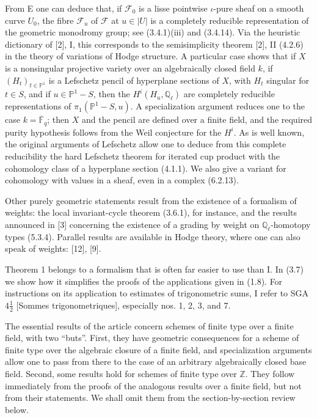 \documentclass[11pt]{article}
\theoremstyle{remark}
\newcommand{\Ql}{\mathbb{Q}_\ell}
\newcommand{\Fbar}{\overline{\mathbb{F}}_q}
\begin{document}
From E one can deduce that, if $\mathcal F_0$ is a lisse pointwise $\iota$-pure sheaf on a smooth curve $U_0$, the fibre $\mathcal F_u$ of $\mathcal F$ at $u\in |U|$ is a completely reducible representation of the geometric monodromy group; see (3.4.1)(iii) and (3.4.14). Via the heuristic dictionary of [2], I, this corresponds to the semisimplicity theorem [2], II (4.2.6) in the theory of variations of Hodge structure. A particular case shows that if $X$ is a nonsingular projective variety over an algebraically closed field $k$, if $(H_t)_{t\in\mathbb P^1}$ is a Lefschetz pencil of hyperplane sections of $X$, with $H_t$ singular for $t\in S$, and if $u\in\mathbb P^1-S$, then the $H^i(H_u,\Ql)$ are completely reducible representations of $\pi_1(\mathbb P^1-S,u)$. A specialization argument reduces one to the case $k=\Fbar$; then $X$ and the pencil are defined over a finite field, and the required purity hypothesis follows from the Weil conjecture for the $H^i$. As is well known, the original arguments of Lefschetz allow one to deduce from this complete reducibility the hard Lefschetz theorem for iterated cup product with the cohomology class of a hyperplane section (4.1.1). We also give a variant for cohomology with values in a sheaf, even in a complex (6.2.13).

Other purely geometric statements result from the existence of a formalism of weights: the local invariant-cycle theorem (3.6.1), for instance, and the results announced in [3] concerning the existence of a grading by weight on $\Ql$-homotopy types (5.3.4). Parallel results are available in Hodge theory, where one can also speak of weights: [12], [9].

Theorem 1 belongs to a formalism that is often far easier to use than I. In (3.7) we show how it simplifies the proofs of the applications given in (1.8). For instructions on its application to estimates of trigonometric sums, I refer to SGA $4\frac12$ [Sommes trigonometriques], especially nos. 1, 2, 3, and 7.

The essential results of the article concern schemes of finite type over a finite field, with two ``buts''. First, they have geometric consequences for a scheme of finite type over the algebraic closure of a finite field, and specialization arguments allow one to pass from there to the case of an arbitrary algebraically closed base field. Second, some results hold for schemes of finite type over $\mathbb Z$. They follow immediately from the proofs of the analogous results over a finite field, but not from their statements. We shall omit them from the section-by-section review below.
\end{document}
